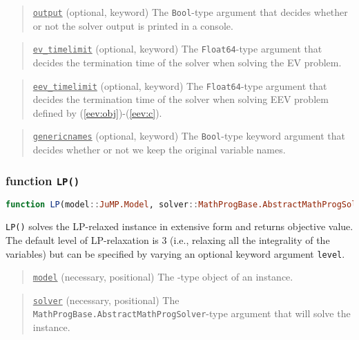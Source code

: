 \begin{quote}
	\noindent\underline{\texttt{output}} (optional, keyword) The \texttt{Bool}-type argument that decides whether or not the solver output is printed in a console.
\end{quote}

\begin{quote}
	\noindent\underline{\texttt{ev\_timelimit}} (optional, keyword) The \texttt{Float64}-type argument that decides the termination time of the solver when solving the EV problem.
\end{quote}

\begin{quote}
	\noindent\underline{\texttt{eev\_timelimit}} (optional, keyword) The \texttt{Float64}-type argument that decides the termination time of the solver when solving EEV problem defined by (\ref{eev:obj})-(\ref{eev:c}).
\end{quote}

\begin{quote}
	\noindent\underline{\texttt{genericnames}} (optional, keyword) The \texttt{Bool}-type keyword argument that decides whether or not we keep the original variable names. 
\end{quote}

\subsubsection{function \texttt{LP()}}
\begin{lstlisting}[frame=single,language=julia]
function LP(model::JuMP.Model, solver::MathProgBase.AbstractMathProgSolver; level::Int=3, output::Bool=false, timelimit::Float64=Inf, genericnames::Bool=true, splice::Bool=false)
\end{lstlisting}
\texttt{LP()} solves the LP-relaxed instance in extensive form and returns objective value. The default level of LP-relaxation is 3 (i.e., relaxing all the integrality of the variables) but can be specified by varying an optional keyword argument \texttt{level}.  
\begin{quote}
	\noindent\underline{\texttt{model}} (necessary, positional) The \jumpmodel-type object of an instance.
\end{quote}

\begin{quote}
	\noindent\underline{\texttt{solver}} (necessary, positional) The \texttt{MathProgBase.AbstractMathProgSolver}-type argument that will solve the instance.
\end{quote}

